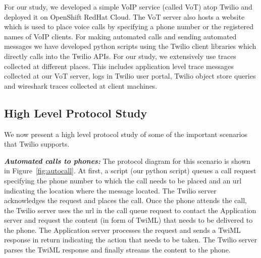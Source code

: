 For our study, we developed a simple VoIP service (called VoT) atop Twilio and deployed it on OpenShift RedHat Cloud. The VoT server also hosts a website which is used to place voice calls by specifying a phone number or the registered names of VoIP clients. For making automated calls and sending automated messages we have developed python scripts using the Twilio client libraries which directly calls into the Twilio APIs. For our study, we extensively use traces collected at different places. This includes application level trace messages collected at our VoT server, logs in Twilio user portal, Twilio object store queries and wireshark traces collected at client machines.

\subsection{High Level Protocol Study}
\label{subsec-protostudy}
We now present a high level protocol study of some of the important scenarios that Twilio supports. 

\emph{\textbf{Automated calls to phones:} }
The protocol diagram for this scenario is shown in  Figure~\ref{fig:autocall}. At first, a script (our python script) queues a call request specifying the phone number to which the call needs to be placed and an url indicating the location where the message located. The Twilio server acknowledges the request and places the call. Once the phone attends the call, the Twilio server uses the url in the call queue request to contact the Application server and request the content (in form of TwiML) that needs to be delivered to the phone. The Application server processes the request and sends a TwiML response in return indicating the action that needs to be taken. The Twilio server parses the TwiML response and finally streams the content to the phone.  


